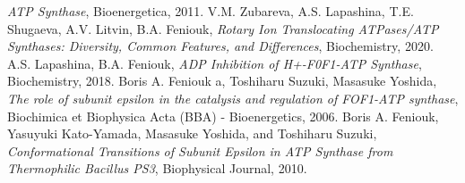 \documentclass{article}
\begin{document}
\begin{thebibliography}{9}
     \emph{ATP Synthase}, Bioenergetica, 2011.
     V.M. Zubareva, A.S. Lapashina, T.E. Shugaeva, A.V. Litvin, B.A. Feniouk, \emph{Rotary Ion Translocating ATPases/ATP Synthases: Diversity, Common Features, and Differences}, Biochemistry, 2020.
     A.S. Lapashina, B.A. Feniouk, \emph{ADP Inhibition of H+-F0F1-ATP Synthase}, Biochemistry, 2018.
     Boris A. Feniouk a, Toshiharu Suzuki, Masasuke Yoshida, \emph{The role of subunit epsilon in the catalysis and regulation of FOF1-ATP synthase}, Biochimica et Biophysica Acta (BBA) - Bioenergetics, 2006.
     Boris A. Feniouk, Yasuyuki Kato-Yamada, Masasuke Yoshida, and Toshiharu Suzuki, \emph{Conformational Transitions of Subunit Epsilon in ATP Synthase from Thermophilic Bacillus PS3}, Biophysical Journal, 2010.
\end{thebibliography}
\end{document}
